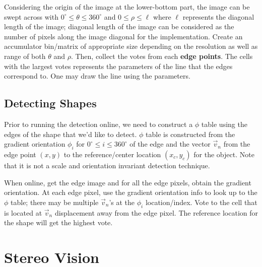 \documentclass{report}
\begin{document}
Considering the origin of the image at the lower-bottom part, the image can be swept across with $0^{\circ} \leq \theta \leq 360^{\circ}$ and $0 \leq \rho \leq \ell$ where $\ell$ represents the diagonal length of the image; diagonal length of the image can be considered as the number of pixels along the image diagonal for the implementation. Create an accumulator bin/matrix of appropriate size depending on the resolution as well as range of both $\theta$ and $\rho$. Then, collect the votes from each \textbf{edge points}. The cells with the largest votes represents the parameters of the line that the edges correspond to. One may draw the line using the parameters.

\subsection{Detecting Shapes}
\hspace{\parindent}Prior to running the detection online, we need to construct a $\phi$ table using the edges of the shape that we'd like to detect. $\phi$ table is constructed from the gradient orientation $\phi_i$ for $0^\circ \leq i \leq 360^\circ$ of the edge and the vector $\vec v_n$ from the edge point $(x, y)$ to the reference/center location $(x_c, y_c)$ for the object. Note that it is not a scale and orientation invariant detection technique.

When online, get the edge image and for all the edge pixels, obtain the gradient orientation. At each edge pixel, use the gradient orientation info to look up to the $\phi$ table; there may be multiple $\vec v_n$'s at the $\phi_i$ location/index. Vote to the cell that is located at $\vec v_n$ displacement away from the edge pixel. The reference location for the shape will get the highest vote.


\section{Stereo Vision}
\end{document}
